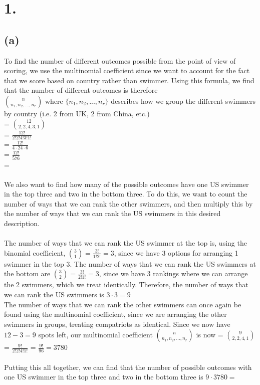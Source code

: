 \documentclass{article}
\begin{document}
\thispagestyle{firstpageheader}

\section*{1.}
{\Large 

\subsection*{(a)}
To find the number of different outcomes possible from the point of view of scoring, we use the multinomial coefficient since we want to account for the fact that we score based on country rather than swimmer. Using this formula, we find that the number of different outcomes is therefore \\
$\binom{n}{n_1, n_2, ..., n_r}$ where $\{n_1, n_2, ..., n_r\} $ describes how we group the different swimmers by country (i.e. 2 from UK, 2 from China, etc.) \\
= $\binom{12}{2, 2, 4, 3, 1}$ \\ 
= $\frac{12!}{2!2!4!3!1!}$ \\ 
= $\frac{12!}{4 \cdot 24 \cdot 6}$ \\ 
= $\frac{12!}{576}$ \\ 
=  \\ \\ 
We also want to find how many of the possible outcomes have one US swimmer in the top three and two in the bottom three. To do this, we want to count the number of ways that we can rank the other swimmers, and then multiply this by the number of ways that we can rank the US swimmers in this desired description. \\
\\ The number of ways that we can rank the US swimmer at the top is, using the binomial coefficient, $\binom{3}{1} = \frac{3!}{1!2!} = 3$, since we have 3 options for arranging 1 swimmer in the top 3. The number of ways that we can rank the US swimmers at the bottom are $\binom{3}{2} = \frac{3!}{2!1!} = 3$, since we have 3 rankings where we can arrange the 2 swimmers, which we treat identically. Therefore, the number of ways that we can rank the US swimmers is $3 \cdot 3 = 9$
\\ The number of ways that we can rank the other swimmers can once again be found using the multinomial coefficient, since we are arranging the other swimmers in groups, treating compatriots as identical. Since we now have $12 - 3 = 9$ spots left, our multinomial coefficient $\binom{n}{n_1, n_2, ..., n_r}$ is now = $\binom{9}{2,2,4,1}$ = $\frac{9!}{2!2!4!1!}$ = $\frac{9!}{96} = 3780$ \\ \\ 
Putting this all together, we can find that the number of possible outcomes with one US swimmer in the top three and two in the bottom three is $9 \cdot 3780 = $ 

}
\end{document}
